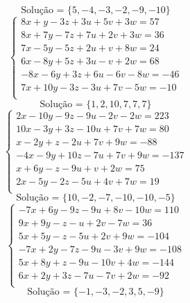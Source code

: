 \documentclass[12pt,oneside,a4paper]{article}
\begin{document}
\begin{equation*}
\text{Solução = }\{5,-4,-3,-2,-9,-10\}
\end{equation*}
\vspace{\baselineskip}
\begin{equation*}
\begin{cases}
8x+y-3z+3u+5v+3w=57 \\
8x+7y-7z+7u+2v+3w=36 \\
7x-5y-5z+2u+v+8w=24 \\
6x-8y+5z+3u-v+2w=68 \\
-8x-6y+3z+6u-6v-8w=-46 \\
7x+10y-3z-3u+7v-5w=-10 \\
\end{cases}
\end{equation*}
\begin{equation*}
\text{Solução = }\{1,2,10,7,7,7\}
\end{equation*}
\vspace{\baselineskip}
\begin{equation*}
\begin{cases}
2x-10y-9z-9u-2v-2w=223 \\
10x-3y+3z-10u+7v+7w=80 \\
x-2y+z-2u+7v+9w=-88 \\
-4x-9y+10z-7u+7v+9w=-137 \\
x+6y-z-9u+v+2w=75 \\
2x-5y-2z-5u+4v+7w=19 \\
\end{cases}
\end{equation*}
\begin{equation*}
\text{Solução = }\{10,-2,-7,-10,-10,-5\}
\end{equation*}
\vspace{\baselineskip}
\begin{equation*}
\begin{cases}
-7x+6y-9z-9u+8v-10w=110 \\
9x+9y-z-u+2v-7w=36 \\
5x+5y-z-5u+2v+9w=-104 \\
-7x+2y-7z-9u-3v+9w=-108 \\
5x+8y+z-9u-10v+4w=-144 \\
6x+2y+3z-7u-7v+2w=-92 \\
\end{cases}
\end{equation*}
\begin{equation*}
\text{Solução = }\{-1,-3,-2,3,5,-9\}
\end{equation*}
\end{document}

